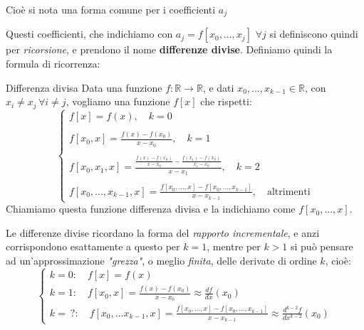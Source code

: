 \documentclass[a4paper,11pt]{article}
\begin{document}
Cioè si nota una forma comune per i coefficienti $a_j$

\par\smallskip

Questi coefficienti, che indichiamo con $a_j = f[x_0, ..., x_j]$ $\forall j$ si definiscono quindi per \textit{ricorsione}, e prendono il nome \textbf{differenze divise}.
Definiamo quindi la formula di ricorrenza:
\begin{definition}{Differenza divisa}
	Data una funzione $f: \mathbb{R} \rightarrow \mathbb{R}$, e dati $x_0, ..., x_{k - 1} \in \mathbb{R}$, con $x_i \neq x_j \, \forall i \neq j$, vogliamo una funzione $f[x]$ che rispetti:
	\[
		\begin{cases}
			f[x] = f(x), \quad k = 0 \\ \\
			f[x_0, x] = \frac{f(x) - f(x_0)}{x - x_0}, \quad k = 1 \\ \\
			f[x_0, x_1, x] = \frac{ \frac{f(x) - f(x_0)}{x - x_0} - \frac{f(x_1) - f(x_0)}{x_1 - x_0} }{x - x_1}, \quad k = 2 \\ \\
			f[x_0, ... , x_{k - 1}, x] = \frac{ f[x_0, ..., x] - f[x_0, ..., x_{k - 1}] }{ x - x_{k - 1} }, \quad \text{altrimenti}
		\end{cases}
	\]
	Chiamiamo questa funzione differenza divisa e la indichiamo come $f[x_0, ..., x ]$.
\end{definition}

Le differenze divise ricordano la forma del \textit{rapporto incrementale}, e anzi corrispondono esattamente a questo per $k = 1$, mentre per $k>1$ si può pensare ad un'approssimazione \textit{"grezza"}, o meglio \textit{finita},  delle derivate di ordine $k$, cioè:
\[
	\begin{cases}
		k = 0 : \quad f[x] = f(x)  \\
		k = 1 : \quad f[x_0, x] = \frac{f(x) - f(x_0)}{x - x_0} \approx \frac{df}{dx}(x_0) \\
		k = \ ? : \quad f[x_0, ... x_{k - 1}, x] = \frac{ f[x_0, ..., x] - f[x_0, ..., x_{k - 1}] }{ x - x_{k - 1} } \approx \frac{d^{k-2}f}{dx^{k-2}}(x_0) 
	\end{cases}
\]
\end{document}
